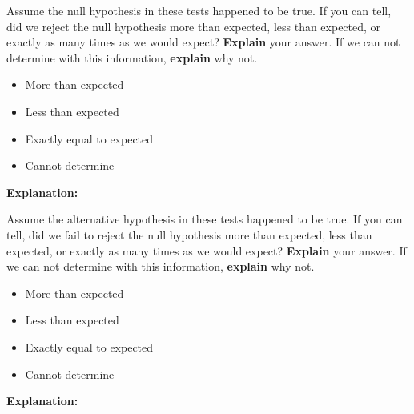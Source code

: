 \begin{enumerate}
 Assume the null hypothesis in these tests happened to be true. If you can tell, did we reject the null hypothesis more than expected, less than expected, or exactly as many times as we would expect? \textbf{Explain} your answer. If we can not determine with this information, \textbf{explain} why not. 
\begin{itemize}[label=\bubble]
\item More than expected
\item Less than expected
\item Exactly equal to expected
\item Cannot determine
\end{itemize} 
\textbf{Explanation:}
\vfill

 Assume the alternative hypothesis in these tests happened to be true. If you can tell, did we fail to reject the null hypothesis more than expected, less than expected, or exactly as many times as we would expect? \textbf{Explain} your answer. If we can not determine with this information, \textbf{explain} why not. 
\begin{itemize}[label=\bubble]
\item More than expected
\item Less than expected
\item Exactly equal to expected
\item Cannot determine
\end{itemize} 
\textbf{Explanation:}
\vfill
\end{enumerate}



